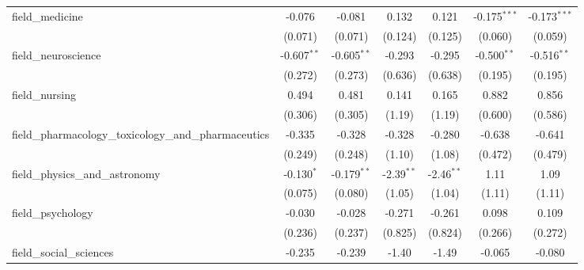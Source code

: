 \begin{tabular}{lcccccc}
   field\_medicine                                             & -0.076         & -0.081         & 0.132          & 0.121          & -0.175$^{***}$ & -0.173$^{***}$\\   
                                                               & (0.071)        & (0.071)        & (0.124)        & (0.125)        & (0.060)        & (0.059)\\   
   field\_neuroscience                                         & -0.607$^{**}$  & -0.605$^{**}$  & -0.293         & -0.295         & -0.500$^{**}$  & -0.516$^{**}$\\   
                                                               & (0.272)        & (0.273)        & (0.636)        & (0.638)        & (0.195)        & (0.195)\\   
   field\_nursing                                              & 0.494          & 0.481          & 0.141          & 0.165          & 0.882          & 0.856\\   
                                                               & (0.306)        & (0.305)        & (1.19)         & (1.19)         & (0.600)        & (0.586)\\   
   field\_pharmacology\_toxicology\_and\_pharmaceutics         & -0.335         & -0.328         & -0.328         & -0.280         & -0.638         & -0.641\\   
                                                               & (0.249)        & (0.248)        & (1.10)         & (1.08)         & (0.472)        & (0.479)\\   
   field\_physics\_and\_astronomy                              & -0.130$^{*}$   & -0.179$^{**}$  & -2.39$^{**}$   & -2.46$^{**}$   & 1.11           & 1.09\\   
                                                               & (0.075)        & (0.080)        & (1.05)         & (1.04)         & (1.11)         & (1.11)\\   
   field\_psychology                                           & -0.030         & -0.028         & -0.271         & -0.261         & 0.098          & 0.109\\   
                                                               & (0.236)        & (0.237)        & (0.825)        & (0.824)        & (0.266)        & (0.272)\\   
   field\_social\_sciences                                     & -0.235         & -0.239         & -1.40          & -1.49          & -0.065         & -0.080\\   

\end{tabular}
